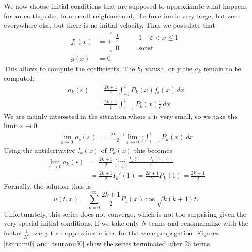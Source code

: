 We now choose initial conditions that are supposed to approximate
what happens for an earthquake.
In a small neighborhood, the function is very large, but zero everywhere
else, but there is no initial velocity.
Thus we postulate that
\begin{align*}
f_\varepsilon(x)&=\begin{cases}
\frac1{\varepsilon}&\qquad 1-\varepsilon<x\le 1\\
0&\qquad\text{sonst}
\end{cases}
\\
g(x)&=0
\end{align*}
This allows to compute the coefficients.
The $b_k$ vanish, only the $a_k$ remain to be computed:
\begin{align*}
a_k(\varepsilon)&=\frac{2k+1}{2}\int_{-1}^1P_k(x)f_\varepsilon(x)\,dx
\\
&=\frac{2k+1}{2}\int_{1-\varepsilon}^1P_k(x)\frac1{\varepsilon}\,dx
\end{align*}
We are mainly interested in the situation where $\varepsilon$ is
very small, so we take the limit $\varepsilon\to 0$
\begin{align*}
\lim_{\varepsilon\to 0} a_k(\varepsilon)
&=
\frac{2k+1}{2}\lim_{\varepsilon\to 0}\frac1{\varepsilon}\int_{1-\varepsilon}^1P_k(x)\,dx
\end{align*}
Using the antiderivative $I_k(x)$ of $P_k(x)$ this becomes
\begin{align*}
\lim_{\varepsilon\to 0} a_k(\varepsilon)
&=
\frac{2k+1}{2}\lim_{\varepsilon\to 0}\frac{I_k(1)-I_k(1-\varepsilon)}{\varepsilon}
\\
&=\frac{2k+1}{2}I_k'(1)=\frac{2k+1}{2}P_k(1)=\frac{2k+1}{2}
\end{align*}
Formally, the solution thus is
\begin{equation}
u(t,x)
=
\sum_{k=0}^\infty \frac{2k+1}{2}P_k(x) \cos \sqrt{k(k+1)}t.
\end{equation}
Unfortunately, this series does not converge, which is not too
surprising given the very special initial conditions.
If we take only $N$ terms and renomarmlize with the factor $\frac1{N^2}$,
we get an approximate idea for the wave propagation.
Figures \ref{tsunami0} and \ref{tsunami50} show the series terminated 
after $25$ terms.
